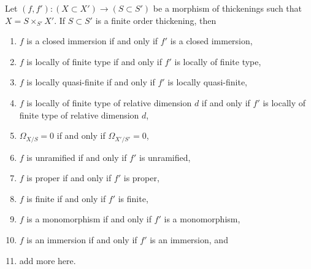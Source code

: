 %
\begin{lemma}
\label{lemma-thicken-property-morphisms-cartesian}
Let $(f, f') : (X \subset X') \to (S \subset S')$ be a morphism
of thickenings such that $X = S \times_{S'} X'$. If $S \subset S'$
is a finite order thickening, then
\begin{enumerate}
\item $f$ is a closed immersion if and only if $f'$ is a closed immersion,
\item $f$ is locally of finite type if and only if $f'$ is
locally of finite type,
\item $f$ is locally quasi-finite if and only if $f'$ is locally
quasi-finite,
\item $f$ is locally of finite type of relative dimension $d$ if and
only if $f'$ is locally of finite type of relative dimension $d$,
\item $\Omega_{X/S} = 0$ if and only if $\Omega_{X'/S'} = 0$,
\item $f$ is unramified if and only if $f'$ is unramified,
\item $f$ is proper if and only if $f'$ is proper,
\item $f$ is finite if and only if $f'$ is finite,
\item $f$ is a monomorphism if and only if $f'$ is a monomorphism,
\item $f$ is an immersion if and only if $f'$ is an immersion, and
\item add more here.
\end{enumerate}
\end{lemma}


